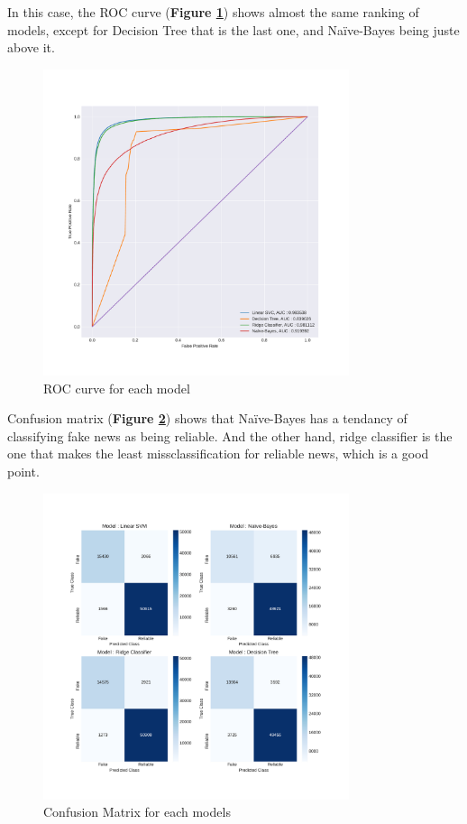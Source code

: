 In this case, the ROC curve (\textbf{Figure \ref{fig:chap3:roc2}}) shows almost the same ranking of models, except for Decision Tree that is the last one, and Na\"{i}ve-Bayes being juste above it. 

\begin{figure}
	\centering
	\includegraphics[width=0.8\textwidth]{images/chapitre3/roc2}
	\caption{ROC curve for each model}
	\label{fig:chap3:roc2}
\end{figure}

Confusion matrix (\textbf{Figure \ref{fig:chap3:confMat2}}) shows that Na\"{i}ve-Bayes has a tendancy of classifying fake news as being reliable. And the other hand, ridge classifier is the one that makes the least missclassification for reliable news, which is a good point. \\

\begin{figure}
	\centering
	\includegraphics[width=0.8\textwidth]{images/chapitre3/test_fake_confMat}
	\caption{Confusion Matrix for each models}
	\label{fig:chap3:confMat2}
\end{figure}

